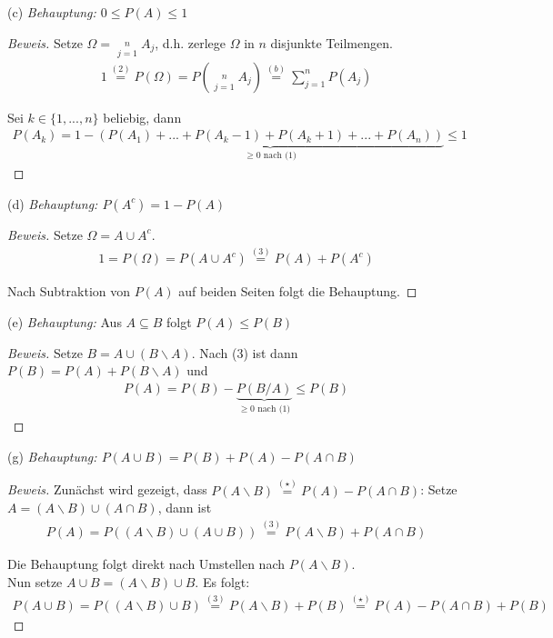 \documentclass[10pt]{article}
\begin{document}
(c) \textit{Behauptung: $0 \leq P(A) \leq 1$}
\begin{proof}[Beweis]
Setze $\Omega = \mathop{\dot\bigcup}\limits_{j=1}^{n} A_j$, d.h. zerlege $\Omega$ in $n$ disjunkte Teilmengen. 
\begin{align*}
    1 \stackrel{(2)}{=} P(\Omega) = P\left( \mathop{\dot\bigcup}\limits_{j=1}^{n} A_j \right) \stackrel{(b)}{=} \sum\limits_{j=1}^{n} P(A_j)
\end{align*}

Sei $k\in\{1,...,n\}$ beliebig, dann
\begin{align*}
    P(A_k) = 1 - \underbrace{(P(A_1) +...+ P(A_k-1) + P(A_k+1) +...+ P(A_n))}_\text{$\geq 0$ nach (1)} \leq 1
\end{align*}

\end{proof}

(d) \textit{Behauptung: $P(A^c) = 1 - P(A)$}
\begin{proof}[Beweis]
Setze $\Omega = A \cup A^c$. 
\begin{align*}
    1 = P(\Omega) = P(A \cup A^c) \stackrel{(3)}{=} P(A) + P(A^c)
\end{align*}

Nach Subtraktion von $P(A)$ auf beiden Seiten folgt die Behauptung.

\end{proof}

(e) \textit{Behauptung: } Aus $A \subseteq B$ folgt $P(A) \leq P(B)$
\begin{proof}[Beweis]
Setze $B = A \cup (B\backslash A)$. Nach (3) ist dann $P(B) = P(A) + P(B\backslash A)$ und 
\begin{align*}
    P(A) = P(B) - \underbrace{P(B/A)}_\text{$\geq 0$ nach (1)} \leq P(B)
\end{align*}

\end{proof}

(g) \textit{Behauptung: $P(A \cup B) = P(B) + P(A) - P(A \cap B)$}
\begin{proof}[Beweis]
Zunächst wird gezeigt, dass $P(A\backslash B) \stackrel{(\star)}{=} P(A) - P(A \cap B)$: Setze $A = (A\backslash B) \cup (A \cap B)$, dann ist 
\begin{align*}
    P(A) = P((A\backslash B)\cup(A \cup B)) \stackrel{(3)}{=} P(A\backslash B) + P(A\cap B)
\end{align*}

Die Behauptung folgt direkt nach Umstellen nach $P(A\backslash B)$. \\
Nun setze $A\cup B = (A\backslash B) \cup B$. Es folgt: 
\begin{align*}
    P(A \cup B) = P((A\backslash B) \cup B) \stackrel{(3)}{=} P(A\backslash B) + P(B) \stackrel{(\star)}{=} P(A) - P(A \cap B) + P(B)
\end{align*}

\end{proof}
\end{document}
